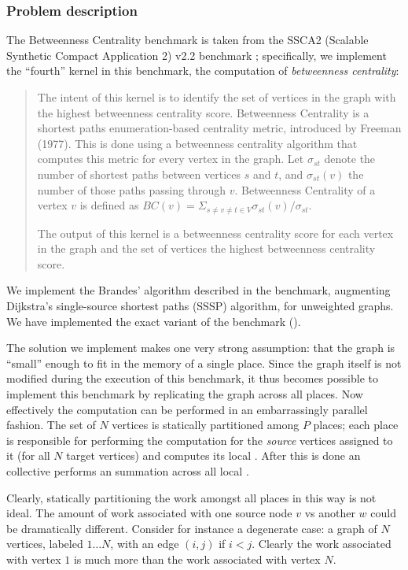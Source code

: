 
\subsubsection{Problem description}
The Betweenness Centrality benchmark is taken from the SSCA2 (Scalable
Synthetic Compact Application 2) v2.2 benchmark \cite{SSCA2};
specifically, we implement the ``fourth'' kernel in this benchmark,
the computation of {\em betweenness centrality}:

\begin{quotation}
The intent of this kernel is to identify the set of vertices in the
graph with the highest betweenness centrality score. Betweenness
Centrality is a shortest paths enumeration-based centrality
metric, introduced by Freeman (1977). This is done using a betweenness
centrality algorithm that computes this metric for every vertex in the
graph. Let $\sigma_{st}$ denote the number of shortest paths between
vertices $s$ and $t$, and $\sigma_{st}(v)$ the number of those paths
passing through $v$. Betweenness Centrality of a vertex $v$ is defined
as $BC(v) = \Sigma_{s\not=v\not=t \in V} \sigma_{st}(v)/\sigma_{st}$.

The output of this kernel is a betweenness centrality score for each
vertex in the graph and the set of vertices the highest betweenness
centrality score.
\end{quotation}

We implement the Brandes' algorithm described in the benchmark,
augmenting Dijkstra's single-source shortest paths (SSSP) algorithm,
for unweighted graphs. We have implemented the exact variant of the benchmark
(). 

The solution we implement makes one very strong assumption: that the
graph is ``small'' enough to fit in the memory of a single
place. Since the graph itself is not modified during the execution of
this benchmark, it thus becomes possible to implement this benchmark
by replicating the graph across all places. Now effectively the
computation can be performed in an embarrassingly parallel fashion. The
set of $N$ vertices is statically partitioned among $P$ places; each place is
responsible for performing the computation for the {\em source}
vertices assigned to it (for all $N$ target vertices) and computes its
local . After this is
done an  collective performs an  summation
    across all local . 

Clearly, statically partitioning the work amongst all places in this
way is not ideal. The amount of work associated with one source node
$v$ vs another $w$ could be dramatically different. Consider for
instance a degenerate case: a graph of $N$ vertices, labeled $1\ldots
N$, with an edge $(i,j)$ if $i < j$. Clearly the work associated with
vertex $1$ is much more than the work associated with vertex $N$. 

